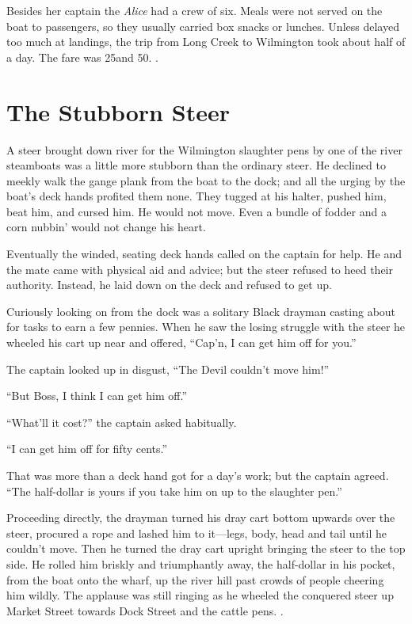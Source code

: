 \documentclass[11pt, a5paper, openright]{book}
\newcommand{\steamer}[1]{\textit{#1}\index{#1,~steamer}}
\begin{document}
Besides her captain the \steamer{Alice} had a crew of six.  Meals were
not served on the boat to passengers, so they usually carried box
snacks or lunches.  Unless delayed too much at landings, the trip from
Long Creek to Wilmington took about half of a day.  The fare was
25\textcent and 50\textcent.  \citep[]{cavalieril}.\par

\section{The Stubborn Steer}

A steer brought down river for the Wilmington slaughter pens by one of
the river steamboats was a little more stubborn than the ordinary
steer.  He declined to meekly walk the gange plank from the boat to the
dock; and all the urging by the boat's deck hands profited them none.
They tugged at his halter, pushed him, beat him, and cursed him.  He
would not move.  Even a bundle of fodder and a corn nubbin' would not
change his heart.\par

Eventually the winded, seating deck hands called on the captain for help.
He and the mate came with physical aid and advice; but the steer refused
to heed their authority.  Instead, he laid down on the deck and refused
to get up.\par

Curiously looking on from the dock was a solitary Black drayman casting
about for tasks to earn a few pennies.  When he saw the losing struggle
with the steer he wheeled his cart up near and offered, ``Cap'n, I can
get him off for you.''\par

The captain looked up in disgust, ``The Devil couldn't move him!''\par

``But Boss, I think I can get him off.''\par

``What'll it cost?'' the captain asked habitually.\par

``I can get him off for fifty cents.''\par

That was more than a deck hand got for a day's work; but the captain
agreed.  ``The half-dollar is yours if you take him on up to the slaughter
pen.''\par

Proceeding directly, the drayman turned his dray cart bottom upwards over
the steer, procured a rope and lashed him to it---legs, body, head and
tail until he couldn't move.  Then he turned the dray cart upright
bringing the steer to the top side.  He rolled him briskly and triumphantly
away, the half-dollar in his pocket, from the boat onto the wharf, up the
river hill past crowds of people cheering him wildly.  The applause was
still ringing as he wheeled the conquered steer up Market Street towards
Dock Street and the cattle pens.  \citep[]{reaveswe}.\par
\end{document}
